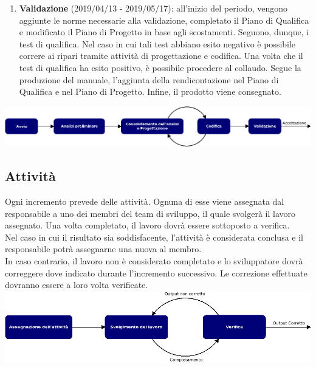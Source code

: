 \begin{enumerate}
	\item \textbf{Validazione} (2019/04/13 - 2019/05/17): all'inizio del periodo, vengono aggiunte le norme necessarie alla validazione, completato il Piano di Qualifica e modificato il Piano di Progetto in base agli scostamenti. Seguono, dunque, i test di qualifica. Nel caso in cui tali test abbiano esito negativo è possibile correre ai ripari tramite attività di progettazione e codifica. Una volta che il test di qualifica ha esito positivo, è possibile procedere al collaudo. Segue la produzione del manuale, l'aggiunta della rendicontazione nel Piano di Qualifica e nel Piano di Progetto. Infine, il prodotto viene consegnato.
\end{enumerate}

\includegraphics[scale=0.4]{images/Model/model.png}

\subsection{Attività}
Ogni incremento prevede delle attività. Ognuna di esse viene assegnata dal responsabile a uno dei membri del team di sviluppo, il quale svolgerà il lavoro assegnato. Una volta completato, il lavoro dovrà essere sottoposto a verifica.\\ Nel caso in cui il risultato sia soddisfacente, l'attività è considerata conclusa e il responsabile potrà assegnarne una nuova al membro.\\ 
In caso contrario, il lavoro non è considerato completato e lo sviluppatore dovrà correggere dove indicato durante l'incremento successivo. Le correzione effettuate dovranno essere a loro volta verificate.\\

\includegraphics[scale=0.4]{images/Model/activity.png}

